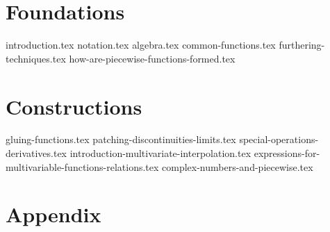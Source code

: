 \documentclass[10pt,a4paper,twoside]{report}
\begin{document}
\maketitle
\tableofcontents
\newpage

\part{Foundations}
{introduction.tex}
{notation.tex}
{algebra.tex}
{common-functions.tex}
{furthering-techniques.tex}
{how-are-piecewise-functions-formed.tex}

\part{Constructions}
{gluing-functions.tex}
{patching-discontinuities-limits.tex}
{special-operations-derivatives.tex}
{introduction-multivariate-interpolation.tex}
{expressions-for-multivariable-functions-relations.tex}
{complex-numbers-and-piecewise.tex}

\part{Appendix}
\printglossary[title=Glossary, toctitle=Glossary]
\glsaddallunused
\end{document}
